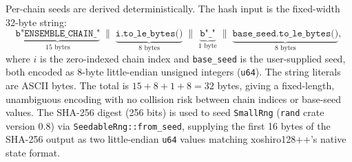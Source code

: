 Per-chain seeds are derived deterministically.
The hash input is the fixed-width 32-byte string:
\[
  \underbrace{\texttt{b"ENSEMBLE\_CHAIN\_"}}_{15\text{ bytes}}
  \;\|\;
  \underbrace{\texttt{i.to\_le\_bytes()}}_{8\text{ bytes}}
  \;\|\;
  \underbrace{\texttt{b"\_"}}_{1\text{ byte}}
  \;\|\;
  \underbrace{\texttt{base\_seed.to\_le\_bytes()}}_{8\text{ bytes}},
\]
where $i$ is the zero-indexed chain index and \texttt{base\_seed} is
the user-supplied seed, both encoded as 8-byte little-endian unsigned
integers (\texttt{u64}).
The string literals are ASCII bytes.
The total is $15 + 8 + 1 + 8 = 32$ bytes, giving a
fixed-length, unambiguous encoding with no collision risk between chain
indices or base-seed values.
The SHA-256 digest (256 bits) is used to seed \texttt{SmallRng}
(\texttt{rand} crate version 0.8) via \texttt{SeedableRng::from\_seed},
supplying the first 16 bytes of the SHA-256 output as two
little-endian \texttt{u64} values matching xoshiro128++'s native
state format.
